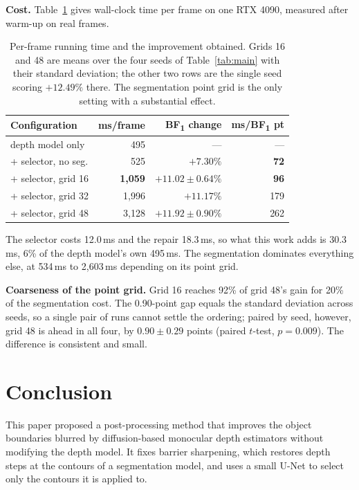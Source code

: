 \documentclass[conference]{IEEEtran}
\newcommand{\bfone}{BF\textsubscript{1}}
\begin{document}
\textbf{Cost.}\label{sec:cost} Table~\ref{tab:cost} gives wall-clock time per frame on one RTX 4090, measured
after warm-up on real frames.

\begin{table}[t]
\caption{Per-frame running time and the improvement obtained. Grids 16 and 48 are means over the
four seeds of Table~\ref{tab:main} with their standard deviation; the other two
rows are the single seed scoring $+12.49\%$ there. The segmentation point grid is
the only setting with a substantial effect.}
\label{tab:cost}
\centering
\begin{tabular}{lrrr}
\toprule
Configuration & ms/frame & \bfone{} change & ms/\bfone{} pt \\
\midrule
depth model only        & 495   & ---        & --- \\
+ selector, no seg.     & 525   & $+7.30\%$  & \textbf{72} \\
+ selector, grid 16     & \textbf{1{,}059} & $\mathbf{+11.02 \pm 0.64\%}$ & \textbf{96} \\
+ selector, grid 32     & 1{,}996 & $+11.17\%$ & 179 \\
+ selector, grid 48     & 3{,}128 & $+11.92 \pm 0.90\%$ & 262 \\
\bottomrule
\end{tabular}
\end{table}

The selector costs 12.0\,ms and the repair 18.3\,ms, so what this work adds is
30.3\,ms, 6\% of the depth model's own 495\,ms. The segmentation dominates
everything else, at 534\,ms to 2{,}603\,ms depending on its point grid.

\textbf{Coarseness of the point grid.} Grid 16 reaches 92\% of grid 48's gain for
20\% of the segmentation cost. The 0.90-point gap equals
the standard deviation across seeds, so a single pair of runs cannot settle the
ordering; paired by seed, however, grid 48 is ahead in all four, by
$0.90 \pm 0.29$ points (paired $t$-test, $p = 0.009$). The difference is consistent and small.

\section{Conclusion}

This paper proposed a post-processing method that improves the object boundaries
blurred by diffusion-based monocular depth estimators without modifying the
depth model. It fixes barrier sharpening, which restores depth steps at the
contours of a segmentation model, and uses a small U-Net to select only the
contours it is applied to.
\end{document}
